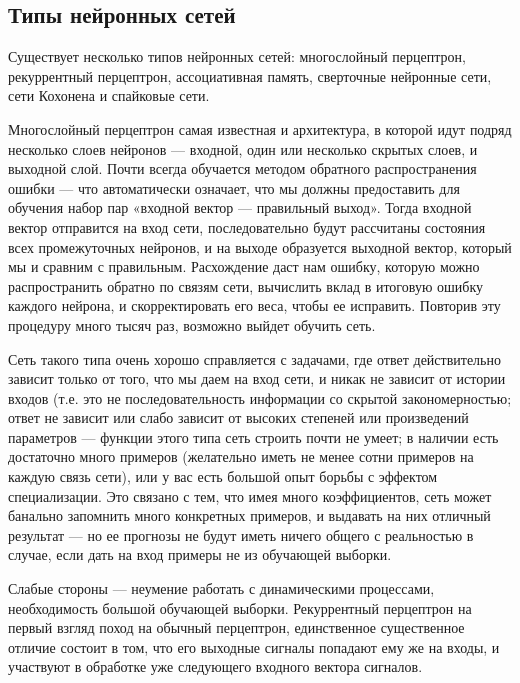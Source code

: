 \subsection{Типы нейронных сетей}
\label{sub:domain:neuro_net_types}

Существует несколько типов нейронных сетей: многослойный перцептрон, рекуррентный перцептрон, ассоциативная память, сверточные нейронные сети, сети Кохонена и спайковые сети.

Многослойный перцептрон самая известная и архитектура, в которой идут подряд несколько слоев нейронов --- входной, один или несколько скрытых слоев, и выходной слой.
Почти всегда обучается методом обратного распространения ошибки --- что автоматически означает, что мы должны предоставить для обучения набор пар «входной вектор --- правильный выход»\cite{domain_romanov}.
Тогда входной вектор отправится на вход сети, последовательно будут рассчитаны состояния всех промежуточных нейронов, и на выходе образуется выходной вектор, который мы и сравним с правильным.
Расхождение даст нам ошибку, которую можно распространить обратно по связям сети, вычислить вклад в итоговую ошибку каждого нейрона, и скорректировать его веса, чтобы ее исправить.
Повторив эту процедуру много тысяч раз, возможно выйдет обучить сеть.

Сеть такого типа очень хорошо справляется с задачами, где ответ действительно зависит только от того, что мы даем на вход сети, и никак не зависит от истории входов (т.е. это не последовательность информации со скрытой закономерностью; ответ не зависит или слабо зависит от высоких степеней или произведений параметров --- функции этого типа сеть строить почти не умеет; в наличии есть достаточно много примеров (желательно иметь не менее сотни примеров на каждую связь сети), или у вас есть большой опыт борьбы с эффектом специализации.
Это связано с тем, что имея много коэффициентов, сеть может банально запомнить много конкретных примеров, и выдавать на них отличный результат --- но ее прогнозы не будут иметь ничего общего с реальностью в случае, если дать на вход примеры не из обучающей выборки.

Слабые стороны --- неумение работать с динамическими процессами, необходимость большой обучающей выборки.
Рекуррентный перцептрон на первый взгляд поход на обычный перцептрон, единственное существенное отличие состоит в том, что его выходные сигналы попадают ему же на входы, и участвуют в обработке уже следующего входного вектора сигналов.

